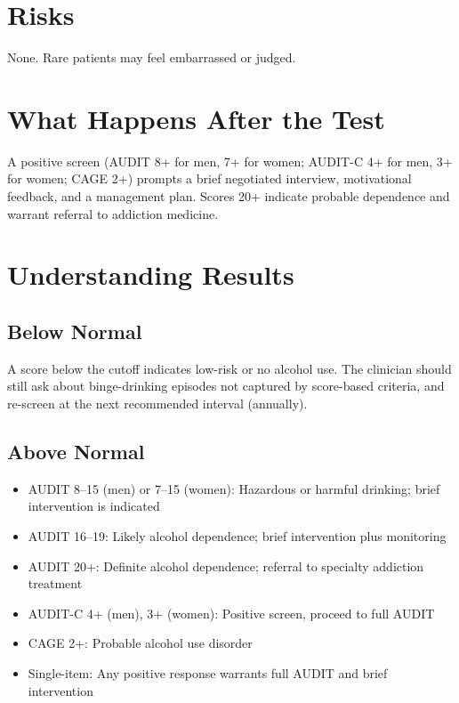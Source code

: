 \section*{Risks}
None. Rare patients may feel embarrassed or judged.

\section*{What Happens After the Test}
A positive screen (AUDIT 8+ for men, 7+ for women; AUDIT-C 4+ for men, 3+ for women; CAGE 2+) prompts a brief negotiated interview, motivational feedback, and a management plan. Scores 20+ indicate probable dependence and warrant referral to addiction medicine.

\section*{Understanding Results}

\subsection*{Below Normal}
A score below the cutoff indicates low-risk or no alcohol use. The clinician should still ask about binge-drinking episodes not captured by score-based criteria, and re-screen at the next recommended interval (annually).

\subsection*{Above Normal}
\begin{itemize}
  \item AUDIT 8--15 (men) or 7--15 (women): Hazardous or harmful drinking; brief intervention is indicated
  \item AUDIT 16--19: Likely alcohol dependence; brief intervention plus monitoring
  \item AUDIT 20+: Definite alcohol dependence; referral to specialty addiction treatment
  \item AUDIT-C 4+ (men), 3+ (women): Positive screen, proceed to full AUDIT
  \item CAGE 2+: Probable alcohol use disorder
  \item Single-item: Any positive response warrants full AUDIT and brief intervention
\end{itemize}

